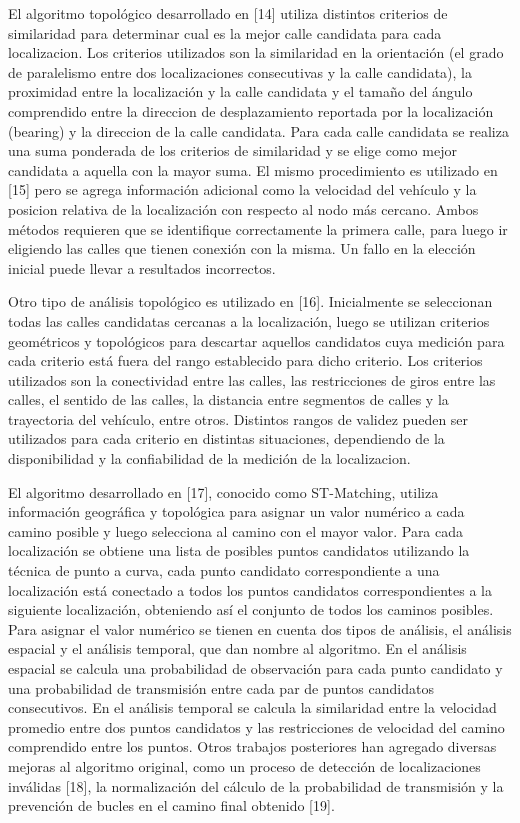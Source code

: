 El algoritmo topológico desarrollado en [14] utiliza distintos criterios de similaridad para determinar cual es la mejor calle candidata para cada localizacion. Los criterios utilizados son la similaridad en la orientación (el grado de paralelismo entre dos localizaciones consecutivas y la calle candidata), la proximidad entre la localización y la calle candidata y el tamaño del ángulo comprendido entre la direccion de desplazamiento reportada por la localización (bearing) y la direccion de la calle candidata. Para cada calle candidata se realiza una suma ponderada de los criterios de similaridad y se elige como mejor candidata a aquella con la mayor suma. El mismo procedimiento es utilizado en [15] pero se agrega información adicional como la velocidad del vehículo y la posicion relativa de la localización con respecto al nodo más cercano. Ambos métodos requieren que se identifique correctamente la primera calle, para luego ir eligiendo las calles que tienen conexión con la misma. Un fallo en la elección inicial puede llevar a resultados incorrectos.

Otro tipo de análisis topológico es utilizado en [16]. Inicialmente se seleccionan todas las calles candidatas cercanas a la localización, luego se utilizan criterios geométricos y topológicos para descartar aquellos candidatos cuya medición para cada criterio está fuera del rango establecido para dicho criterio. Los criterios utilizados son la conectividad entre las calles, las restricciones de giros entre las calles, el sentido de las calles, la distancia entre segmentos de calles y la trayectoria del vehículo, entre otros. Distintos rangos de validez pueden ser utilizados para cada criterio en distintas situaciones, dependiendo de la disponibilidad y la confiabilidad de la medición de la localizacion.

El algoritmo desarrollado en [17], conocido como ST-Matching, utiliza información geográfica y topológica para asignar un valor numérico a cada camino posible y luego selecciona al camino con el mayor valor. Para cada localización se obtiene una lista de  posibles puntos candidatos utilizando la técnica de punto a curva, cada punto candidato correspondiente a una localización está conectado a todos los puntos candidatos correspondientes a la siguiente localización, obteniendo así el conjunto de todos los caminos posibles. Para asignar el valor numérico se tienen en cuenta dos tipos de análisis, el análisis espacial y el análisis temporal, que dan nombre al algoritmo. En el análisis espacial se calcula una probabilidad de observación para cada punto candidato y una probabilidad de transmisión entre cada par de puntos candidatos consecutivos. En el análisis temporal se calcula la similaridad entre la velocidad promedio entre dos puntos candidatos y las restricciones de velocidad del camino comprendido entre los puntos. Otros trabajos posteriores han agregado diversas mejoras al algoritmo original, como un proceso de detección de localizaciones inválidas [18], la normalización del cálculo de la probabilidad de transmisión y la prevención de bucles en el camino final obtenido [19].

